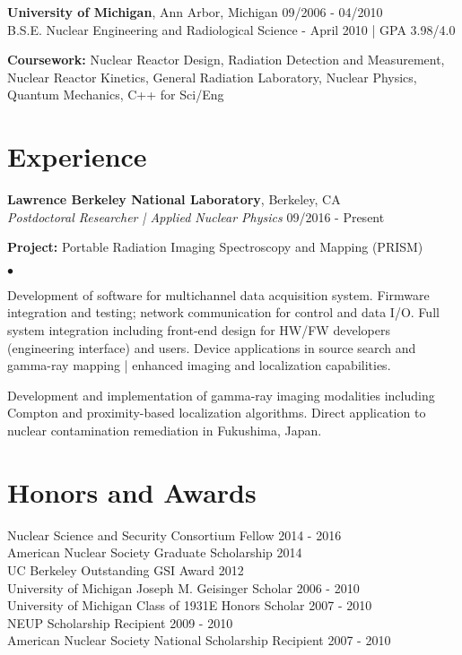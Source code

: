 \documentclass[margin,line]{res}
\newenvironment{list1}{
  \begin{list}{\ding{113}}{%
      \setlength{\itemsep}{0in}
      \setlength{\parsep}{0in} \setlength{\parskip}{0in}
      \setlength{\topsep}{0in} \setlength{\partopsep}{0in} 
      \setlength{\leftmargin}{0.17in}}}{\end{list}}
\newenvironment{list2}{
  \begin{list}{$\bullet$}{%
      \setlength{\itemsep}{0in}
      \setlength{\parsep}{0in} \setlength{\parskip}{0in}
      \setlength{\topsep}{0in} \setlength{\partopsep}{0in} 
      \setlength{\leftmargin}{0.2in}}}{\end{list}}
\begin{document}
\begin{resume}
{\bf University of Michigan}, Ann Arbor, Michigan \hfill 09/2006 - 04/2010\\
B.S.E. Nuclear Engineering and Radiological Science - April 2010 | GPA 3.98/4.0
\begin{list1}
\item[] {\bf \small Coursework:} Nuclear Reactor Design, Radiation Detection 
                                 and Measurement, Nuclear Reactor Kinetics,
                                 General Radiation Laboratory, Nuclear Physics,
                                 Quantum Mechanics, C++ for Sci/Eng
\end{list1}

\section{\sc Experience}
{\bf Lawrence Berkeley National Laboratory}, Berkeley, CA \\
{\em Postdoctoral Researcher | Applied Nuclear Physics} \hfill 09/2016 - Present

\begin{list1}
  \item[] {\bf \small Project:} Portable Radiation Imaging Spectroscopy and Mapping (PRISM)
  \begin{list2}
    \item Development of software for multichannel data acquisition system.
          Firmware integration and testing; network communication for control and data I/O.
          Full system integration including front-end design for HW/FW developers
          (engineering interface) and users.
          Device applications in source search and gamma-ray mapping | enhanced imaging
          and localization capabilities.
    \item Development and implementation of gamma-ray imaging modalities including
          Compton and proximity-based localization algorithms.
          Direct application to nuclear contamination remediation in 
          Fukushima, Japan.
  \end{list2}
\end{list1}

\section{\sc Honors and Awards} 

Nuclear Science and Security Consortium Fellow \hfill 2014 - 2016 \\
American Nuclear Society Graduate Scholarship \hfill 2014 \\
UC Berkeley Outstanding GSI Award \hfill 2012 \\
University of Michigan Joseph M. Geisinger Scholar \hfill 2006 - 2010 \\
University of Michigan Class of 1931E Honors Scholar \hfill 2007 - 2010 \\
NEUP Scholarship Recipient \hfill 2009 - 2010 \\
American Nuclear Society National Scholarship Recipient \hfill 2007 - 2010 \\


\end{resume}
\end{document}
